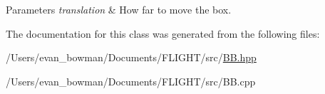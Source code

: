 \begin{DoxyParams}{Parameters}
{\em translation} & How far to move the box. \\
\hline
\end{DoxyParams}


The documentation for this class was generated from the following files\+:\begin{DoxyCompactItemize}
\item 
/\+Users/evan\+\_\+bowman/\+Documents/\+F\+L\+I\+G\+H\+T/src/\hyperlink{_b_b_8hpp}{B\+B.\+hpp}\item 
/\+Users/evan\+\_\+bowman/\+Documents/\+F\+L\+I\+G\+H\+T/src/B\+B.\+cpp\end{DoxyCompactItemize}
